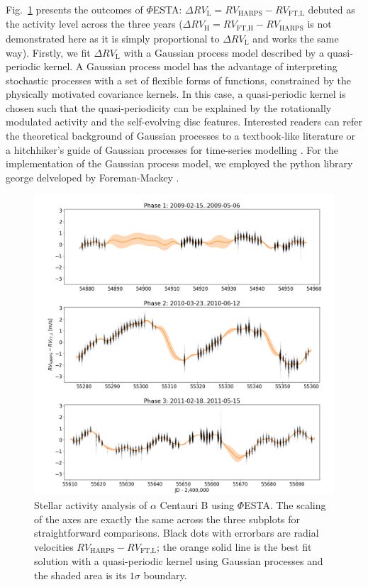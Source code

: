 Fig.~\ref{fig:Alpha_Cen_B} presents the outcomes of $\mathit{\Phi}$ESTA: $\Delta RV_\text{L} = RV_\text{HARPS} - RV_\text{FT,L}$ debuted as the activity level across the three years ($\Delta RV_\text{H} = RV_\text{FT,H} - RV_\text{HARPS}$ is not demonstrated here as it is simply proportional to $\Delta RV_\text{L}$ and works the same way). Firstly, we fit $\Delta RV_\text{L}$ with a Gaussian process model described by a quasi-periodic kernel. A Gaussian process model has the advantage of interpreting stochastic processes with a set of flexible forms of functions, constrained by the physically motivated covariance kernels. In this case, a quasi-periodic kernel is chosen such that the quasi-periodicity can be explained by the rotationally modulated activity and the self-evolving disc features. Interested readers can refer the theoretical background of Gaussian processes to a textbook-like literature \cite{Rasmussen2006} or a hitchhiker's guide of Gaussian processes for time-series modelling \cite{Roberts_gaussianprocesses}. For the implementation of the Gaussian process model, we employed the python library george delveloped by Foreman-Mackey \cite{Ambikasaran2014}. 

\begin{figure}[tbp]
\centering
\includegraphics[width = 1.0 \linewidth]
{./Figures/Methods/Alpha_Cen_B.png}
\caption[$\alpha$ Centauri B: stellar activity analysis]
		{Stellar activity analysis of $\alpha$ Centauri B using $\mathit{\Phi}$ESTA. The scaling of the axes are exactly the same across the three subplots for straightforward comparisons. Black dots with errorbars are radial velocities $RV_\text{HARPS} - RV_\text{FT,L}$; the orange solid line is the best fit solution with a quasi-periodic kernel using Gaussian processes and the shaded area is its $1\sigma$ boundary.}
\label{fig:Alpha_Cen_B}
\end{figure} 

